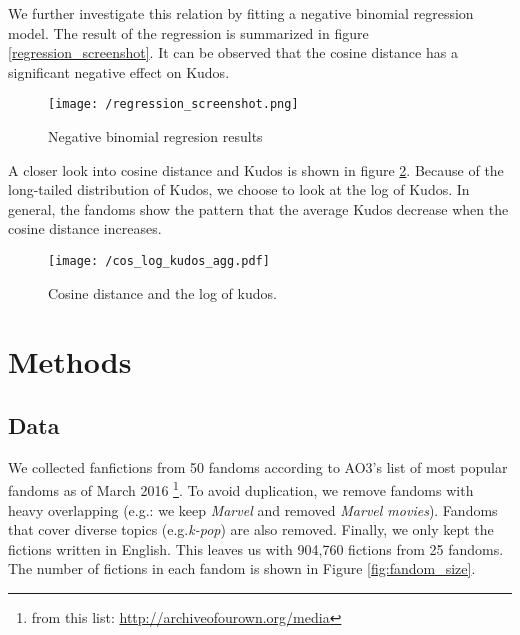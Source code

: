 \documentclass[a4paper]{article}
\begin{document}
We further investigate this relation by fitting a negative binomial regression model. The result of the regression is summarized in figure \ref{regression_screenshot}. It can be observed that the cosine distance has a significant negative effect on Kudos.

\begin{figure}[htbp]
\begin{center}
\texttt{[image: /regression\_screenshot.png]}
\caption{Negative binomial regresion results}
\label{fig:regression}
\end{center}
\end{figure}

A closer look into cosine distance and Kudos is shown in figure \ref{fig:cos_kudos}. Because of the long-tailed distribution of Kudos, we choose to look at the log of Kudos. In general, the fandoms show the pattern that the average Kudos decrease when the cosine distance increases.


\begin{figure}[htbp]
\begin{center}
\texttt{[image: /cos\_log\_kudos\_agg.pdf]}
\caption{Cosine distance and the log of kudos.}
\label{fig:cos_kudos}
\end{center}
\end{figure}







\section{Methods} %
\label{sec:methods}


\subsection{Data}
We collected fanfictions from 50 fandoms according to AO3's list of most popular fandoms as of March 2016 \footnote{from this list: \url{http://archiveofourown.org/media}}. To avoid duplication, we remove fandoms with heavy overlapping (e.g.: we keep \emph{Marvel} and removed \emph{Marvel movies}). Fandoms that cover diverse topics (e.g.\emph{k-pop}) are also removed. Finally, we only kept the fictions written in English. This leaves us with 904,760 fictions from 25 fandoms. The number of fictions in each fandom is shown in Figure \ref{fig:fandom_size}.
\end{document}
